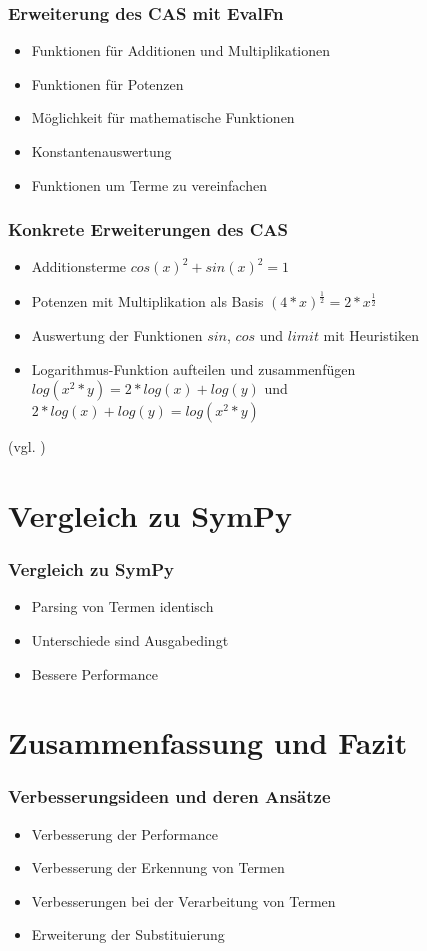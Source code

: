 \documentclass{beamer}
\begin{document}
\begin{frame}[fragile]
  \frametitle{Erweiterung des CAS mit EvalFn}
  \begin{itemize}
    \item Funktionen für Additionen und Multiplikationen
    \pause
    \item Funktionen für Potenzen
    \pause
    \item Möglichkeit für mathematische Funktionen
    \pause
    \item Konstantenauswertung
    \pause
    \item Funktionen um Terme zu vereinfachen
  \end{itemize}
\end{frame}

\begin{frame}[fragile]
  \frametitle{Konkrete Erweiterungen des CAS}
  \begin{itemize}
    \item Additionsterme $cos(x)^2+sin(x)^2 = 1$
    \pause
    \item Potenzen mit Multiplikation als Basis $(4*x)^\frac{1}{2} = 2 * x^\frac{1}{2}$
    \pause
    \item Auswertung der Funktionen $sin$, $cos$ und $limit$ mit Heuristiken
    \pause
    \item Logarithmus-Funktion aufteilen und zusammenfügen $log(x^2*y) = 2*log(x)+log(y)$ und $2*log(x)+log(y) = log(x^2*y)$
  \end{itemize}
  {\small (vgl. \cite{WhyRust})}
\end{frame}

\section{Vergleich zu SymPy}
\begin{frame}[fragile]
  \frametitle{Vergleich zu SymPy}
  \begin{itemize}
    \item Parsing von Termen identisch
    \pause
    \item Unterschiede sind Ausgabedingt
    \pause
    \item Bessere Performance
  \end{itemize}
\end{frame}

\section{Zusammenfassung und Fazit}
\begin{frame}[fragile]
  \frametitle{Verbesserungsideen und deren Ansätze}
  \begin{itemize}
    \item Verbesserung der Performance
    \pause
    \item Verbesserung der Erkennung von Termen
    \pause
    \item Verbesserungen bei der Verarbeitung von Termen
    \pause
    \item Erweiterung der Substituierung
  \end{itemize}
\end{frame}
\end{document}
